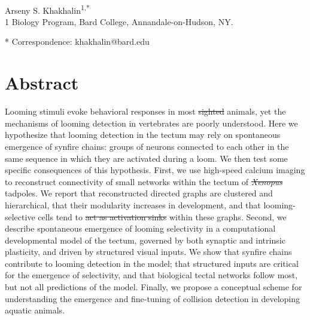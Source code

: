 \documentclass{article}
\providecommand{\DIFaddtex}[1]{{\protect\color{blue}{#1}}} %
\providecommand{\DIFdeltex}[1]{{\protect\color{red}\sout{#1}}}                      %
\providecommand{\DIFaddbegin}{} %
\providecommand{\DIFaddend}{} %
\providecommand{\DIFdelbegin}{} %
\providecommand{\DIFdelend}{} %
\providecommand{\DIFadd}[1]{\texorpdfstring{\DIFaddtex{#1}}{#1}} %
\providecommand{\DIFdel}[1]{\texorpdfstring{\DIFdeltex{#1}}{}} %
\newcommand{\DIFscaledelfig}{0.5}
\newlength{\DIFdelgraphicswidth} %
\newlength{\DIFdelgraphicsheight} %
\newcommand{\DIFaddincludegraphics}[2][]{{\color{blue}\fbox{\DIFOincludegraphics[#1]{#2}}}} %
\newcommand{\DIFdelincludegraphics}[2][]{%
\sbox{\DIFdelgraphicsbox}{\DIFOincludegraphics[#1]{#2}}%
\settoboxwidth{\DIFdelgraphicswidth}{\DIFdelgraphicsbox} %
\settoboxtotalheight{\DIFdelgraphicsheight}{\DIFdelgraphicsbox} %
\scalebox{\DIFscaledelfig}{%
\parbox[b]{\DIFdelgraphicswidth}{\usebox{\DIFdelgraphicsbox}\\[-\baselineskip] \rule{\DIFdelgraphicswidth}{0em}}\llap{\resizebox{\DIFdelgraphicswidth}{\DIFdelgraphicsheight}{%
\setlength{\unitlength}{\DIFdelgraphicswidth}%
\begin{picture}(1,1)%
\thicklines\linethickness{2pt} %
{\color[rgb]{1,0,0}\put(0,0){\framebox(1,1){}}}%
{\color[rgb]{1,0,0}\put(0,0){\line( 1,1){1}}}%
{\color[rgb]{1,0,0}\put(0,1){\line(1,-1){1}}}%
\end{picture}%
}\hspace*{3pt}}} %
} %
\DeclareRobustCommand{\DIFaddbegin}{\DIFOaddbegin \let\includegraphics\DIFaddincludegraphics} %
\DeclareRobustCommand{\DIFaddend}{\DIFOaddend \let\includegraphics\DIFOincludegraphics} %
\DeclareRobustCommand{\DIFdelbegin}{\DIFOdelbegin \let\includegraphics\DIFdelincludegraphics} %
\DeclareRobustCommand{\DIFdelend}{\DIFOaddend \let\includegraphics\DIFOincludegraphics} %
\begin{document}



\begin{flushleft}
{\Large
\textbf{}
}
\newline
\\
Arseny S. Khakhalin\textsuperscript{1,*}
\\
\bigskip
{1} Biology Program, Bard College, Annandale-on-Hudson, NY. 

* Correspondence: khakhalin@bard.edu






\section*{Abstract}
Looming stimuli evoke behavioral responses in most \DIFdelbegin \DIFdel{sighted }\DIFdelend animals, yet the mechanisms of looming detection in vertebrates are poorly understood. Here we hypothesize that looming detection in the tectum may rely on spontaneous emergence of synfire chains: groups of neurons connected to each other in the same sequence in which they are activated during a loom. We then test some specific consequences of this hypothesis. First, we use high-speed calcium imaging to reconstruct \DIFaddbegin \DIFadd{functional }\DIFaddend connectivity of small networks within the tectum of \DIFdelbegin \textit{\DIFdel{Xenopus}} %
\DIFdelend \DIFaddbegin \DIFadd{Xenopus }\DIFaddend tadpoles. We report that reconstructed directed graphs are clustered and hierarchical, that their modularity increases in development, and that looming-selective cells tend to \DIFdelbegin \DIFdel{act as activation sinks }\DIFdelend \DIFaddbegin \DIFadd{collect activation }\DIFaddend within these graphs. Second, we describe spontaneous emergence of looming selectivity in a computational developmental model of the tectum, governed by both synaptic and intrinsic plasticity, and driven by structured visual inputs. We show that synfire chains contribute to looming detection in the model; that structured inputs are critical for the emergence of selectivity, and that biological tectal networks follow most, but not all predictions of the model. Finally, we propose a conceptual scheme for understanding the emergence and fine-tuning of collision detection in developing aquatic animals.
\bigskip

\end{flushleft} %
\end{document}
